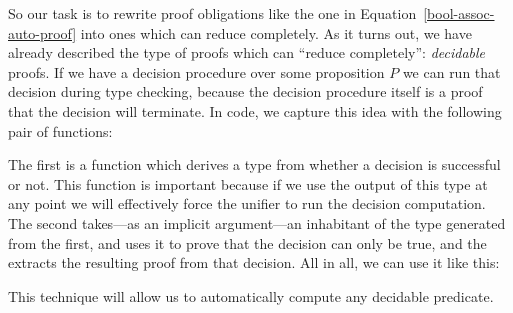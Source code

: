 So our task is to rewrite proof obligations like the one in
Equation~\ref{bool-assoc-auto-proof} into ones which can reduce completely. 
As it turns out, we have already described the type of proofs which can ``reduce
completely'': \emph{decidable} proofs.
If we have a decision procedure over some proposition \(P\) we can run that
decision during type checking, because the decision procedure itself is a proof
that the decision will terminate.
In code, we capture this idea with the following pair of functions:
\begin{multicols}{2}
  \begin{agdalisting}
  \end{agdalisting} \columnbreak
  \begin{agdalisting}
  \end{agdalisting}
\end{multicols}
The first is a function which derives a type from whether a decision is
successful or not.
This function is important because if we use the output of this type at any
point we will effectively force the unifier to run the decision computation.
The second takes---as an implicit argument---an inhabitant of the type generated
from the first, and uses it to prove that the decision can only be true, and the
extracts the resulting proof from that decision.
All in all, we can use it like this:
\begin{agdalisting}
\end{agdalisting}
This technique will allow us to automatically compute any decidable predicate.
